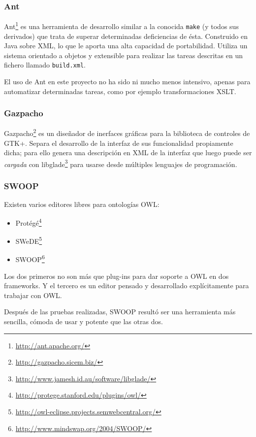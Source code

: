 \subsubsection{Ant}

Ant\footnote{\url{http://ant.apache.org/}} es una herramienta de desarrollo 
similar a la conocida \texttt{make} (y todos sus derivados) que trata de 
superar determinadas deficiencias de ésta. Construido en Java sobre XML, 
lo que le aporta una alta capacidad de portabilidad. Utiliza un sistema 
orientado a objetos y extensible para realizar las tareas descritas en un 
fichero llamado \texttt{build.xml}.

El uso de Ant en este proyecto no ha sido ni mucho menos intensivo, apenas para
automatizar determinadas tareas, como por ejemplo transformaciones XSLT.

\subsubsection{Gazpacho}

Gazpacho\footnote{\url{http://gazpacho.sicem.biz/}} es un diseñador de inerfaces
gráficas para la biblioteca de controles de GTK+. Separa el desarrollo de la interfaz
de sus funcionalidad propiamente dicha; para ello genera una descripción en XML
de la interfaz que luego puede ser \emph{cargada} con 
libglade\footnote{\url{http://www.jamesh.id.au/software/libglade/}} para usarse
desde múltiples lenguajes de programación.

\subsubsection{SWOOP}

Existen varios editores libres para ontologías OWL:

\begin{itemize}
  \item Protégé\footnote{\url{http://protege.stanford.edu/plugins/owl/}}
  \item SWeDE\footnote{\url{http://owl-eclipse.projects.semwebcentral.org/}}
  \item SWOOP\footnote{\url{http://www.mindswap.org/2004/SWOOP/}}
\end{itemize}

Los dos primeros no son más que plug-ins para dar soporte a OWL en dos 
frameworks. Y el tercero es un editor pensado y desarrollado explícitamente
para trabajar con OWL.

Después de las pruebas realizadas, SWOOP resultó ser una herramienta más sencilla,
cómoda de usar y potente que las otras dos.

